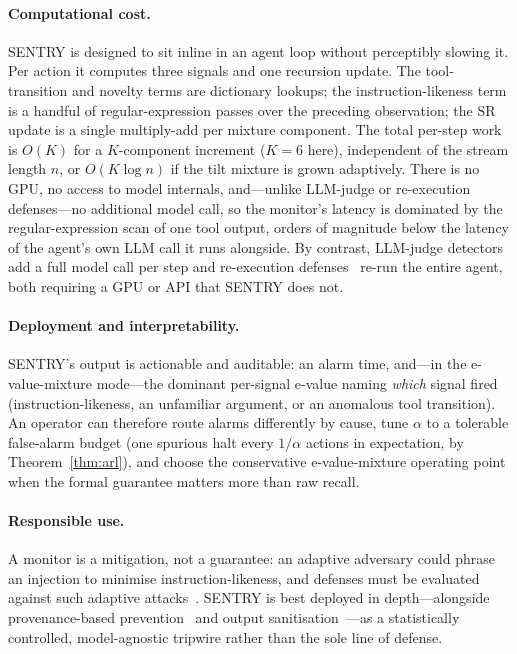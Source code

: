 \documentclass[10pt,journal,compsoc]{IEEEtran}
\theoremstyle{plain}
\theoremstyle{definition}
\begin{document}
\paragraph{Computational cost.} SENTRY is designed to sit inline in an agent
loop without perceptibly slowing it. Per action it computes three signals and
one recursion update. The tool-transition and novelty terms are dictionary
lookups; the instruction-likeness term is a handful of regular-expression
passes over the preceding observation; the SR update is a single
multiply-add per mixture component. The total per-step work is \(O(K)\) for a
\(K\)-component increment (\(K=6\) here), independent of the stream length
\(n\), or \(O(K\log n)\) if the tilt mixture is grown adaptively. There is no
GPU, no access to model internals, and---unlike LLM-judge or
re-execution defenses---no additional model call, so the monitor's latency is
dominated by the regular-expression scan of one tool output, orders of
magnitude below the latency of the agent's own LLM call it runs alongside.
By contrast, LLM-judge detectors add a full model call per step and
re-execution defenses~\cite{zhu2025melon} re-run the entire agent, both
requiring a GPU or API that SENTRY does not.

\paragraph{Deployment and interpretability.} SENTRY's output is
actionable and auditable: an alarm time, and---in the e-value-mixture
mode---the dominant per-signal e-value naming \emph{which} signal fired
(instruction-likeness, an unfamiliar argument, or an anomalous tool
transition). An operator can therefore route alarms differently by cause, tune
\(\alpha\) to a tolerable false-alarm budget (one spurious halt every
\(1/\alpha\) actions in expectation, by Theorem~\ref{thm:arl}), and choose the
conservative e-value-mixture operating point when the formal guarantee matters
more than raw recall.

\paragraph{Responsible use.} A monitor is a mitigation, not a guarantee: an
adaptive adversary could phrase an injection to minimise instruction-likeness,
and defenses must be evaluated against such adaptive
attacks~\cite{nasr2025attackersecond}. SENTRY is best deployed in
depth---alongside provenance-based prevention~\cite{debenedetti2025camel} and
output sanitisation~\cite{das2025commandsans}---as a statistically controlled,
model-agnostic tripwire rather than the sole line of defense.
\end{document}
